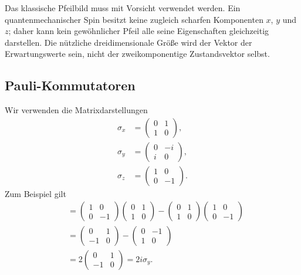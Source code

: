 Das klassische Pfeilbild muss mit Vorsicht verwendet werden. Ein quantenmechanischer Spin besitzt keine zugleich scharfen Komponenten \(x\), \(y\) und \(z\); daher kann kein gewöhnlicher Pfeil alle seine Eigenschaften gleichzeitig darstellen. Die nützliche dreidimensionale Größe wird der Vektor der Erwartungswerte sein, nicht der zweikomponentige Zustandsvektor selbst.

\subsection{Pauli-Kommutatoren}

Wir verwenden die Matrixdarstellungen
\begin{equation}
\begin{aligned}
\sigma_x&=
\begin{pmatrix}0&1\\1&0\end{pmatrix},\\[0.4em]
\sigma_y&=
\begin{pmatrix}0&-i\\i&0\end{pmatrix},\\[0.4em]
\sigma_z&=
\begin{pmatrix}1&0\\0&-1\end{pmatrix}.
\end{aligned}
\end{equation}
Zum Beispiel gilt
\begin{align}
[\sigma_z,\sigma_x]
&=
\begin{pmatrix}1&0\\0&-1\end{pmatrix}
\begin{pmatrix}0&1\\1&0\end{pmatrix}
-
\begin{pmatrix}0&1\\1&0\end{pmatrix}
\begin{pmatrix}1&0\\0&-1\end{pmatrix}\\
&=
\begin{pmatrix}0&1\\-1&0\end{pmatrix}
-
\begin{pmatrix}0&-1\\1&0\end{pmatrix}\\
&=2
\begin{pmatrix}0&1\\-1&0\end{pmatrix}
=2i\sigma_y.
\end{align}
